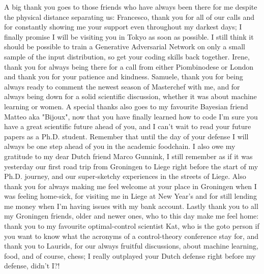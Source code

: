A big thank you goes to those friends who have always been there for me despite the physical distance separating us: Francesco, thank you for all of our calls and for constantly showing me your support even throughout my darkest days; I finally promise I will be visiting you in Tokyo as soon as possible. I still think it should be possible to train a Generative Adversarial Network on only a small sample of the input distribution, so get your coding skills back together. Irene, thank you for always being there for a call from either Piombinodese or London and thank you for your patience and kindness. Samuele, thank you for being always ready to comment the newest season of Masterchef with me, and for always being down for a solid scientific discussion, whether it was about machine learning or women. A special thanks also goes to my favourite Bayesian friend Matteo aka "Bijoux", now that you have finally learned how to code I'm sure you have a great scientific future ahead of you, and I can't wait to read your future papers as a Ph.D. student. Remember that until the day of your defense I will always be one step ahead of you in the academic foodchain. I also owe my gratitude to my dear Dutch friend Marco Gunnink, I still remember as if it was yesterday our first road trip from Groningen to Liege right before the start of my Ph.D. journey, and our super-sketchy experiences in the streets of Liege. Also thank you for always making me feel welcome at your place in Groningen when I was feeling home-sick, for visiting me in Liege at New Year's and for still lending me money when I'm having issues with my bank account. Lastly thank you to all my Groningen friends, older and newer ones, who to this day make me feel home: thank you to my favourite optimal-control scientist Kat, who is the goto person if you want to know what the acronyms of a control-theory conference stay for, and thank you to Laurids, for our always fruitful discussions, about machine learning, food, and of course, chess; I really outplayed your Dutch defense right before my defense, didn't I?!       

